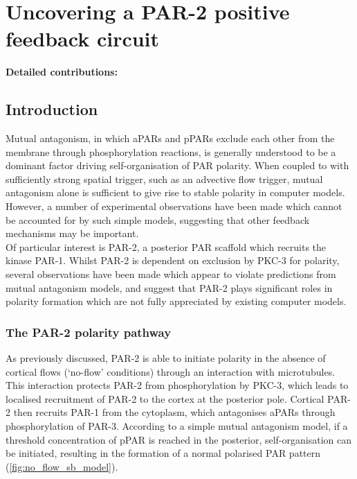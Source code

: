 \documentclass[12pt]{"report"}
\begin{document}
\clearpage
\chapter{Uncovering a PAR-2 positive feedback circuit}

\textbf{Detailed contributions:}\\

\clearpage
\section{Introduction}


Mutual antagonism, in which aPARs and pPARs exclude each other from the membrane through phosphorylation reactions, is generally understood to be a dominant factor driving self-organisation of PAR polarity. When coupled to with sufficiently strong spatial trigger, such as an advective flow trigger, mutual antagonism alone is sufficient to give rise to stable polarity in computer models. However, a number of experimental observations have been made which cannot be accounted for by such simple models, suggesting that other feedback mechanisms may be important.\\

Of particular interest is PAR-2, a posterior PAR scaffold which recruits the kinase PAR-1. Whilst PAR-2 is dependent on exclusion by PKC-3 for polarity, several observations have been made which appear to violate predictions from mutual antagonism models, and suggest that PAR-2 plays significant roles in polarity formation which are not fully appreciated by existing computer models.\\

\subsection{The PAR-2 polarity pathway}

As previously discussed, PAR-2 is able to initiate polarity in the absence of cortical flows (`no-flow' conditions) through an interaction with microtubules. This interaction protects PAR-2 from phosphorylation by PKC-3, which leads to localised recruitment of PAR-2 to the cortex at the posterior pole. Cortical PAR-2 then recruits PAR-1 from the cytoplasm, which antagonises aPARs through phosphorylation of PAR-3. According to a simple mutual antagonism model, if a threshold concentration of pPAR is reached in the posterior, self-organisation can be initiated, resulting in the formation of a normal polarised PAR pattern (\cref{fig:no_flow_sb_model}). \\
\end{document}
